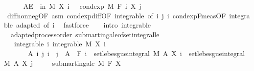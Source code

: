 \begin{isabellebody}
\ \ \ \ \isamarkupfalse%
\ {\isachardoublequoteopen}AE\ {\isasymxi}\ in\ M{\isachardot}{\kern0pt}\ X\ i\ {\isasymxi}\ {\isasymle}\ cond{\isacharunderscore}{\kern0pt}exp\ M\ {\isacharparenleft}{\kern0pt}F\ i{\isacharparenright}{\kern0pt}\ {\isacharparenleft}{\kern0pt}X\ j{\isacharparenright}{\kern0pt}\ {\isasymxi}{\isachardoublequoteclose}\ \isanewline
\ \ \ \ \ \ \isamarkupfalse%
\ diff{\isacharunderscore}{\kern0pt}nonneg{\isacharbrackleft}{\kern0pt}OF\ asm{\isacharbrackright}{\kern0pt}\ cond{\isacharunderscore}{\kern0pt}exp{\isacharunderscore}{\kern0pt}diff{\isacharbrackleft}{\kern0pt}OF\ integrable{\isacharparenleft}{\kern0pt}{}{\isacharcomma}{\kern0pt}{}{\isacharparenright}{\kern0pt}{\isacharcomma}{\kern0pt}\ of\ i\ j\ i{\isacharbrackright}{\kern0pt}\ cond{\isacharunderscore}{\kern0pt}exp{\isacharunderscore}{\kern0pt}F{\isacharunderscore}{\kern0pt}meas{\isacharbrackleft}{\kern0pt}OF\ integrable\ adapted{\isacharcomma}{\kern0pt}\ of\ i{\isacharbrackright}{\kern0pt}\ \isamarkupfalse%
\ fastforce\isanewline
\ \ \isacommand{{\isacharbraceright}{\kern0pt}}\isamarkupfalse%
\isanewline
{}\isamarkupfalse%
\ {\isacharparenleft}{\kern0pt}intro\ integrable{\isacharparenright}{\kern0pt}%
\endisatagproof
{\isafoldproof}%
%
\isadelimproof
\isanewline
%
\endisadelimproof
\isanewline
{}\isamarkupfalse%
\ {\isacharparenleft}{\kern0pt}\ adapted{\isacharunderscore}{\kern0pt}process{\isacharunderscore}{\kern0pt}order{\isacharparenright}{\kern0pt}\ submartingale{\isacharunderscore}{\kern0pt}of{\isacharunderscore}{\kern0pt}set{\isacharunderscore}{\kern0pt}integral{\isacharunderscore}{\kern0pt}le{\isacharcolon}{\kern0pt}\isanewline
\ \ \ integrable{\isacharcolon}{\kern0pt}\ {\isachardoublequoteopen}{\isasymAnd}i{\isachardot}{\kern0pt}\ integrable\ M\ {\isacharparenleft}{\kern0pt}X\ i{\isacharparenright}{\kern0pt}{\isachardoublequoteclose}\isanewline
\ \ \ \ \ \ \ {\isachardoublequoteopen}{\isasymAnd}A\ i\ j{\isachardot}{\kern0pt}\ i\ {\isasymle}\ j\ {\isasymLongrightarrow}\ A\ {\isasymin}\ F\ i\ {\isasymLongrightarrow}\ set{\isacharunderscore}{\kern0pt}lebesgue{\isacharunderscore}{\kern0pt}integral\ M\ A\ {\isacharparenleft}{\kern0pt}X\ i{\isacharparenright}{\kern0pt}\ {\isasymle}\ set{\isacharunderscore}{\kern0pt}lebesgue{\isacharunderscore}{\kern0pt}integral\ M\ A\ {\isacharparenleft}{\kern0pt}X\ j{\isacharparenright}{\kern0pt}{\isachardoublequoteclose}\isanewline
\ \ \ \ \ {\isachardoublequoteopen}submartingale\ M\ F\ X{\isachardoublequoteclose}\isanewline

\end{isabellebody}
